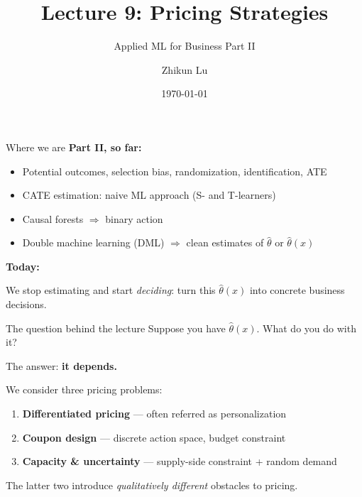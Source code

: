 \documentclass[aspectratio=169, 11pt, handout]{beamer}
\title[Lecture 10]{Lecture 9: Pricing Strategies}
\subtitle{Applied ML for Business Part II}
\author{Zhikun Lu}
\date{\today}
\begin{document}
\frame{\titlepage}


\begin{frame}{Where we are}
\textbf{Part II, so far:}
\begin{itemize}
    \item Potential outcomes, selection bias, randomization, identification, ATE
    \item CATE estimation: naive ML approach (S- and T-learners)
    \item Causal forests \;$\Rightarrow$\; binary action
    \item Double machine learning (DML) \;$\Rightarrow$\; clean estimates of $\hat\theta$ or $\hat\theta(x)$ 
\end{itemize}

\bigskip 

\textbf{Today:} 

\bigskip 

We stop estimating and start \emph{deciding}: turn this $\hat\theta(x)$ into concrete business decisions.

\end{frame}

\begin{frame}{The question behind the lecture}
Suppose you have $\hat\theta(x)$. What do you do with it?

\bigskip

The answer: \textbf{it depends.}

\bigskip

We consider three pricing problems:
\begin{enumerate}
    \item \textcolor{sbgreen}{\textbf{Differentiated pricing}} --- often referred as personalization
    \item \textcolor{noteblue}{\textbf{Coupon design}} --- discrete action space, budget constraint
    \item \textcolor{abnbred}{\textbf{Capacity \& uncertainty}} --- supply-side constraint + random demand
\end{enumerate}

\bigskip

The latter two introduce \emph{qualitatively different} obstacles to pricing.
\end{frame}
\end{document}
